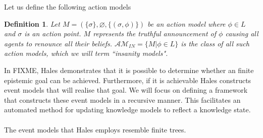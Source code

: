 \documentclass[12pt, a4paper, titlepage]{scrartcl}
\newtheorem{defn}{Definition}
\newtheorem{lemma}{Lemma}
\begin{document}
Let us define the following action models
\begin{defn} \label{insanity}
Let $M = (\{ \sigma \}, \varnothing, \{(\sigma, \phi)\}) $ be an action model
where $\phi \in L$ and $\sigma$ is an action point.
$M$ represents the truthful announcement of $\phi$ causing all agents to renounce all their beliefs.
$\mathcal{AM}_{IN} = \{M | \phi \in L\}$ is the class of all such action models,
which we will term ``insanity models".
\end{defn}

In FIXME, Hales demonstrates that it is possible to determine whether an
finite epistemic goal can be achieved.
Furthermore, if it is achievable Hales constructs event models that will realise
that goal.
We will focus on defining a framework that constructs these event models in a
recursive manner.
This facilitates an automated method for updating knowledge models to reflect a
knowledge state.\\
\\
The event models that Hales employs resemble finite trees.
\end{document}

